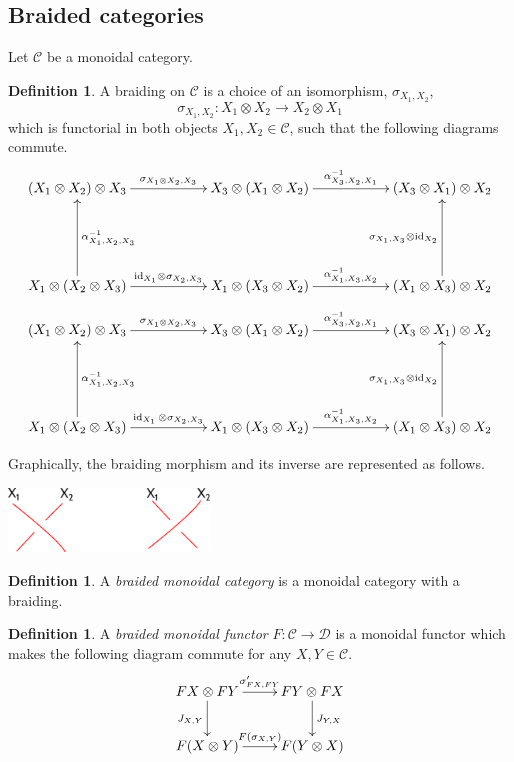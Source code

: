 \documentclass[11pt]{book}
\theoremstyle{Rem}
\theoremstyle{definition}
\newtheorem{Def}[theorem]{Definition}
\numberwithin{equation}{section}
\newcommand\inv{^{-1}}
\newcommand\id{\operatorname{id}}
\newcommand\C{\mathcal C}
\newcommand\D{\mathcal D}
\newcommand{\ra}\rightarrow
\begin{document}
\subsection{Braided categories}
Let $\C$ be a monoidal category. 

\begin{Def}
A braiding on $\C$ is a choice of an isomorphism, $\sigma_{X_1, X_2}$,
\begin{equation}
	\sigma_{X_1, X_2} : X_1\otimes X_2 \rightarrow X_2 \otimes X_1
\end{equation}
which is functorial in both objects $X_1, X_2\in \C$, such that the following diagrams commute.
 \begin{align} \label{hex}
\xymatrix { (X_1\otimes X_2)\otimes X_3 \ar[rr]^{\sigma_{X_1\otimes X_2, X_3}}  & & X_3  \otimes(X_1\otimes X_2)\ar[rr]^{\alpha\inv_{X_3,X_2,X_1}}&& (X_3\otimes X_1)\otimes X_2 \\
\\
X_1\otimes (X_2\otimes X_3) \ar[uu]_{\alpha\inv_{X_1, X_2, X_3}}\ar[rr]^{\text{id}_{X_1}\otimes \sigma_{X_2, X_3} }&& X_1\otimes (X_3\otimes X_2) \ar[rr]^{\alpha\inv_{X_1, X_3,X_2}} && (X_1\otimes X_3)\otimes X_2 \ar[uu]^{\sigma_{X_1,X_3}\otimes \id_{X_2}} }
\end{align}
\begin{align} 
\xymatrix { (X_1\otimes X_2)\otimes X_3 \ar[rr]^{\sigma_{X_1\otimes X_2, X_3}}  & & X_3  \otimes(X_1\otimes X_2)\ar[rr]^{\alpha\inv_{X_3,X_2,X_1}}&& (X_3\otimes X_1)\otimes X_2 \\
\\
X_1\otimes (X_2\otimes X_3) \ar[uu]_{\alpha\inv_{X_1, X_2, X_3}}\ar[rr]^{\id_{X_1}\otimes \sigma_{X_2, X_3} }&& X_1\otimes (X_3\otimes X_2) \ar[rr]^{\alpha\inv_{X_1, X_3,X_2}} && (X_1\otimes X_3)\otimes X_2 \ar[uu]^{\sigma_{X_1,X_3}\otimes \id_{X_2}} }\label{hex2}
\end{align}

\end{Def}
Graphically, the braiding morphism and its inverse are represented as follows. 
\begin{center}
\includegraphics[width=0.4\textwidth]{braiding.eps}
\end{center}
\begin{Def}

A \textit{braided monoidal category} is a monoidal category with a braiding.

\end{Def}
\begin{Def}
A \textit{braided monoidal functor} $F:\C\ra\D$ is a monoidal functor which makes the following diagram commute for any $X, Y \in \C$.
\[
\xymatrix{FX \otimes FY \ar[r]^{\sigma'_{FX, FY}} \ar[d]_{J_{X, Y}} & FY \otimes FX \ar[d]^{J_{Y,X}}\\
F(X\otimes Y) \ar[r]^{F(\sigma_{X, Y})} & F(Y\otimes X)}
\]
\end{Def}
\end{document}

